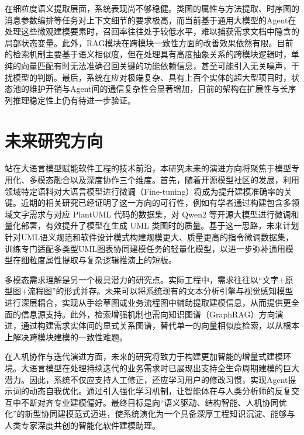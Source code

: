 在细粒度语义提取层面，系统表现尚不够稳健。类图的属性与方法提取、时序图的消息参数编排等任务对上下文细节的要求极高，而当前基于通用大模型的Agent在处理这些微观建模要素时，召回率往往处于较低水平，难以捕获需求文档中隐含的局部状态变量。此外，RAG模块在跨模块一致性方面的改善效果依然有限。目前的检索机制主要基于语义相似度，但在处理具有高度抽象关系的跨模块逻辑时，单纯的向量匹配有时无法准确召回关键的功能依赖信息，甚至可能引入无关噪声，干扰模型的判断。最后，系统在应对极端复杂、具有上百个实体的超大型项目时，状态池的维护开销与Agent间的通信复杂性会显著增加，目前的架构在扩展性与长序列推理稳定性上仍有待进一步验证。

\section{未来研究方向}

站在大语言模型赋能软件工程的技术前沿，本研究未来的演进方向将聚焦于模型专用化、多模态融合以及深度协作三个维度。首先，随着开源模型社区的发展，利用领域特定语料对大语言模型进行微调（Fine-tuning）将成为提升建模准确率的关键。近期的相关研究已经证明了这一方向的可行性，例如有学者通过构建包含多领域文字需求与对应 PlantUML 代码的数据集，对 Qwen2 等开源大模型进行微调和量化部署，有效提升了模型在生成 UML 类图时的质量\cite{li2025domainuml}。基于这一思路，未来计划针对UML语义规范和软件设计模式构建规模更大、质量更高的指令微调数据集，训练专门适配多类型UML图表协同建模任务的轻量化模型，以进一步弥补通用模型在细粒度属性提取与复杂逻辑推演上的短板。

多模态需求理解是另一个极具潜力的研究点。实际工程中，需求往往以“文字+原型图+流程图”的形式并存。未来可以将系统现有的文本分析引擎与视觉感知模型进行深层耦合，实现从手绘草图或业务流程图中辅助提取建模信息，从而提供更全面的信息源支持。此外，检索增强机制也需向知识图谱（GraphRAG）方向演进，通过构建需求实体间的显式关系图谱，替代单一的向量相似度检索，以从根本上解决跨模块建模的一致性难题。

在人机协作与迭代演进方面，未来的研究将致力于构建更加智能的增量式建模环境。大语言模型在处理持续迭代的业务需求时已展现出支持全生命周期建模的巨大潜力\cite{xie2026iterative}。因此，系统不仅应支持人工修正，还应学习用户的修改习惯，实现Agent提示词的动态自我优化。通过引入强化学习机制，让智能体在与人类分析师的反复交互中不断对齐专业建模偏好。最终目标是向“语义驱动、结构智能、人机协同优化”的新型协同建模范式迈进\cite{song2025umlai}，使系统演化为一个具备深厚工程知识沉淀、能够与人类专家深度共创的智能化软件建模助理。